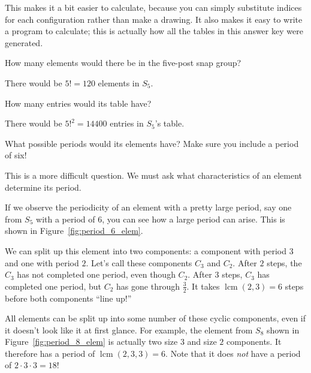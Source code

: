 \documentclass[../gatm_answers.tex]{subfiles}
\begin{document}
This makes it a bit easier to calculate, because you can simply substitute indices for each configuration rather than make a drawing. It also makes it easy to write a program to calculate; this is actually how all the tables in this answer key were generated.

\begin{outer_problem}
	\item
\end{outer_problem}

\begin{inner_problem}[start=1]
	 \item How many elements would there be in the five-post snap group? \label{prob:five_post_snap_list_start}
\end{inner_problem}

There would be $5!=120$ elements in $S_5$.

\begin{inner_problem}
	\item How many entries would its table have?
\end{inner_problem}

There would be $5!^2=14400$ entries in $S_5$'s table.

\begin{inner_problem}
	\item What possible periods would its elements have? Make sure you include a period of six! \label{prob:five_post_snap_list_end}
\end{inner_problem}

This is a more difficult question. We must ask what characteristics of an element determine its period.

If we observe the periodicity of an element with a pretty large period, say one from $S_5$ with a period of $6$, you can see how a large period can arise. This is shown in Figure~\ref{fig:period_6_elem}.

We can split up this element into two components: a component with period $3$ and one with period $2$. Let's call these components $C_3$ and $C_2$. After $2$ steps, the $C_3$ has not completed one period, even though $C_2$. After $3$ steps, $C_3$ has completed one period, but $C_2$ has gone through $\frac{3}{2}$. It takes $\operatorname{lcm}(2,3) = 6$ steps before both components ``line up!''

All elements can be split up into some number of these cyclic components, even if it doesn't look like it at first glance. For example, the element from $S_8$ shown in Figure~\ref{fig:period_8_elem} is actually two size $3$ and size $2$ components. It therefore has a period of $\operatorname{lcm}(2,3,3)=6$. Note that it does \textit{not} have a period of $2\cdot 3\cdot 3 = 18$!
\end{document}
